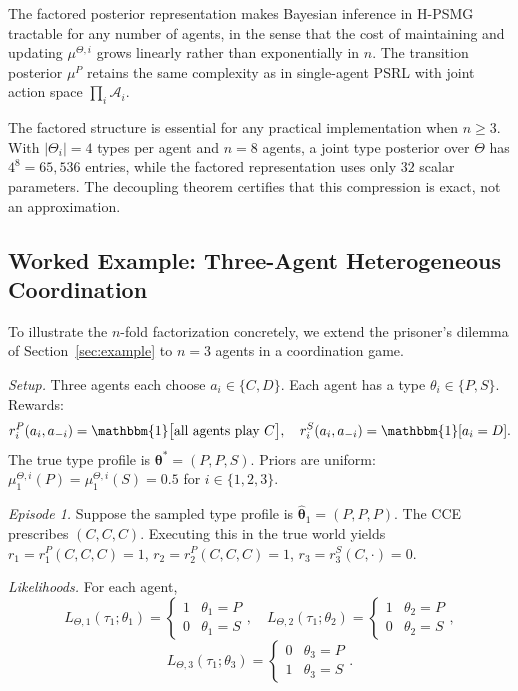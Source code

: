 \begin{corollary}
\label{cor:scale}
The factored posterior representation makes Bayesian inference in H-PSMG tractable for any number of agents, in the sense that the cost of maintaining and updating $\mu^{\Theta,i}$ grows linearly rather than exponentially in $n$. The transition posterior $\mu^P$ retains the same complexity as in single-agent PSRL with joint action space $\prod_i \mathcal{A}_i$.
\end{corollary}

\begin{remark}
The factored structure is essential for any practical implementation when $n \geq 3$. With $|\Theta_i| = 4$ types per agent and $n = 8$ agents, a joint type posterior over $\Theta$ has $4^8 = 65{,}536$ entries, while the factored representation uses only $32$ scalar parameters. The decoupling theorem certifies that this compression is exact, not an approximation.
\end{remark}

\subsection{Worked Example: Three-Agent Heterogeneous Coordination}

To illustrate the $n$-fold factorization concretely, we extend the prisoner's dilemma of Section~\ref{sec:example} to $n=3$ agents in a coordination game.

\textit{Setup.} Three agents each choose $a_i \in \{C, D\}$. Each agent has a type $\theta_i \in \{P, S\}$. Rewards:
\begin{equation}
r_i^P(a_i, a_{-i}) = \mathbbm{1}\big[\text{all agents play } C\big], \quad r_i^S(a_i, a_{-i}) = \mathbbm{1}[a_i = D].
\end{equation}
The true type profile is $\boldsymbol{\theta}^* = (P, P, S)$. Priors are uniform: $\mu_1^{\Theta,i}(P) = \mu_1^{\Theta,i}(S) = 0.5$ for $i \in \{1,2,3\}$.

\textit{Episode 1.} Suppose the sampled type profile is $\hat{\boldsymbol{\theta}}_1 = (P, P, P)$. The CCE prescribes $(C, C, C)$. Executing this in the true world yields $r_1 = r_1^P(C,C,C) = 1$, $r_2 = r_2^P(C,C,C) = 1$, $r_3 = r_3^S(C, \cdot) = 0$.

\textit{Likelihoods.} For each agent,
\begin{equation}
L_{\Theta,1}(\tau_1; \theta_1) = \begin{cases} 1 & \theta_1 = P \\ 0 & \theta_1 = S \end{cases}, \quad
L_{\Theta,2}(\tau_1; \theta_2) = \begin{cases} 1 & \theta_2 = P \\ 0 & \theta_2 = S \end{cases},
\end{equation}
\begin{equation}
L_{\Theta,3}(\tau_1; \theta_3) = \begin{cases} 0 & \theta_3 = P \\ 1 & \theta_3 = S \end{cases}.
\end{equation}

